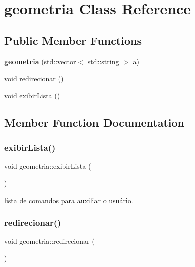 \hypertarget{classgeometria}{}\section{geometria Class Reference}
\label{classgeometria}
\subsection*{Public Member Functions}
\begin{DoxyCompactItemize}
\item 
\mbox{\label{classgeometria_a1ec5a89280795e3c16039e78e1c79d9b}} 
{\bfseries geometria} (std\+::vector$<$ std\+::string $>$ a)
\item 
void \mbox{\hyperlink{classgeometria_a8d79ad08a59914d895f22a2e08269ca9}{redirecionar}} ()
\item 
void \mbox{\hyperlink{classgeometria_a6c4f67cda5e77a099232bdd5b9ff2df9}{exibir\+Lista}} ()
\end{DoxyCompactItemize}


\subsection{Member Function Documentation}
\mbox{\label{classgeometria_a6c4f67cda5e77a099232bdd5b9ff2df9}} 
\subsubsection{\texorpdfstring{exibir\+Lista()}{exibirLista()}}
{\footnotesize\ttfamily void geometria\+::exibir\+Lista (\begin{DoxyParamCaption}{ }\end{DoxyParamCaption})}

lista de comandos para auxiliar o usuário.\mbox{\label{classgeometria_a8d79ad08a59914d895f22a2e08269ca9}} 
\subsubsection{\texorpdfstring{redirecionar()}{redirecionar()}}
{\footnotesize\ttfamily void geometria\+::redirecionar (\begin{DoxyParamCaption}{ }\end{DoxyParamCaption})}

